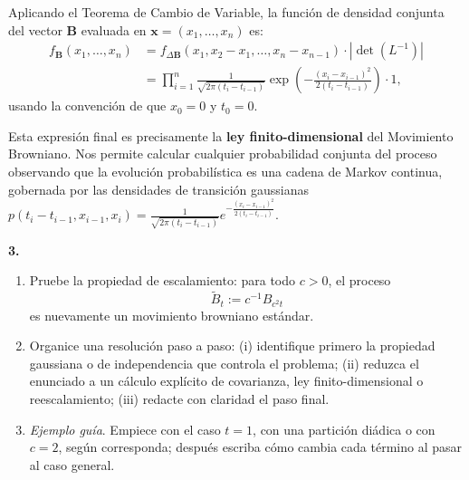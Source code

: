 \documentclass[11pt, letterpaper]{article}
\begin{document}
\begin{solucion}
    Aplicando el Teorema de Cambio de Variable, la función de densidad conjunta del vector $\mathbf{B}$ evaluada en $\mathbf{x} = (x_1, \dots, x_n)$ es:
    \begin{align*}
        f_{\mathbf{B}}(x_1, \dots, x_n) &= f_{\Delta \mathbf{B}}(x_1, x_2 - x_1, \dots, x_n - x_{n-1}) \cdot |\det(L^{-1})| \\
        &= \prod_{i=1}^n \frac{1}{\sqrt{2\pi(t_i - t_{i-1})}} \exp\left( -\frac{(x_i - x_{i-1})^2}{2(t_i - t_{i-1})} \right) \cdot 1,
    \end{align*}
    usando la convención de que $x_0 = 0$ y $t_0 = 0$.
    
    Esta expresión final es precisamente la \textbf{ley finito-dimensional} del Movimiento Browniano. Nos permite calcular cualquier probabilidad conjunta del proceso observando que la evolución probabilística es una cadena de Markov continua, gobernada por las densidades de transición gaussianas $p(t_i - t_{i-1}, x_{i-1}, x_i) = \frac{1}{\sqrt{2\pi(t_i - t_{i-1})}} e^{-\frac{(x_i - x_{i-1})^2}{2(t_i - t_{i-1})}}$.
\end{solucion}

\newpage

\begin{ejercicio}
    \textbf{3.} 
    \begin{enumerate}
        \item Pruebe la propiedad de escalamiento: para todo $c > 0$, el proceso
        $$ \tilde{B}_t := c^{-1} B_{c^2 t} $$
        es nuevamente un movimiento browniano estándar.
        \item Organice una resolución paso a paso: (i) identifique primero la propiedad gaussiana o de independencia que controla el problema; (ii) reduzca el enunciado a un cálculo explícito de covarianza, ley finito-dimensional o reescalamiento; (iii) redacte con claridad el paso final.
        \item \textit{Ejemplo guía}. Empiece con el caso $t = 1$, con una partición diádica o con $c = 2$, según corresponda; después escriba cómo cambia cada término al pasar al caso general.
    \end{enumerate}
\end{ejercicio}

\vspace{5mm}
\end{document}
